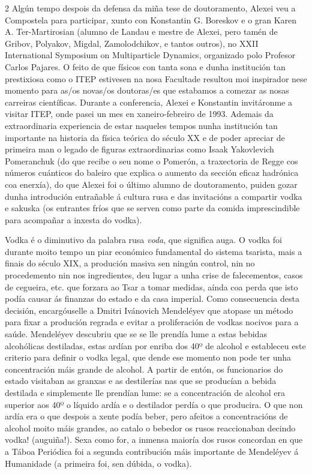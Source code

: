 \begin{multicols}{2}
Algún tempo despois da defensa da miña tese de doutoramento, Alexei veu a
Compostela para participar, xunto con Konstantin G. Boreskov e o gran Karen A.
Ter-Martirosian (alumno de Landau e mestre de Alexei, pero tamén de Gribov,
Polyakov, Migdal, Zamolodchikov, e tantos outros), no XXII International
Symposium on Multiparticle Dynamics, organizado polo Profesor Carlos Pajares. O
feito de que físicos con tanta sona e dunha institución tan prestixiosa como o
ITEP estivesen na nosa Facultade resultou moi inspirador nese momento para
as/os novas/os doutoras/es que estabamos a comezar as nosas carreiras
científicas. Durante a conferencia, Alexei e Konstantin invitáronme a visitar
ITEP, onde pasei un mes en xaneiro-febreiro de 1993. Ademais da extraordinaria
experiencia de estar naqueles tempos nunha institución tan importante na
historia da física teórica do século XX e de poder apreciar de primeira man o
legado de figuras extraordinarias como Isaak Yakovlevich Pomeranchuk (do que
recibe o seu nome o Pomerón, a traxectoria de Regge cos números cuánticos do
baleiro que explica o aumento da sección eficaz hadrónica coa enerxía), do que
Alexei foi o último alumno de doutoramento, puiden gozar dunha introdución
entrañable á cultura rusa e das invitacións a compartir vodka e sakuska (os
entrantes fríos que se serven como parte da comida imprescindible para
acompañar a inxesta do vodka).

Vodka é o diminutivo da palabra rusa \textit{voda}, que significa auga. O vodka
foi durante moito tempo un piar económico fundamental do sistema tsarista, mais
a finais do século XIX, a produción masiva sen ningún control, nin no
procedemento nin nos ingredientes, deu lugar a unha crise de falecementos,
casos de cegueira, etc. que forzara ao Tsar a tomar medidas, aínda coa perda
que isto podía causar ás finanzas do estado e da casa imperial. Como
consecuencia desta decisión, encargóuselle a Dmitri Ivánovich Mendeléyev que
atopase un método para fixar a produción regrada e evitar a proliferación de
vodkas nocivos para a saúde. Mendeléyev descubriu que se se lle prendía lume a
estas bebidas alcohólicas destiladas, estas ardían por enriba dos 40º de
alcohol e estableceu este criterio para definir o vodka legal, que dende ese
momento non pode ter unha concentración máis grande de alcohol. A partir de
entón, os funcionarios do estado visitaban as granxas e as destilerías nas que
se producían a bebida destilada e simplemente lle prendían lume: se a
concentración de alcohol era superior aos 40º o líquido ardía e o destilador
perdía o que producira. O que non ardía era o que despois a xente podía beber,
pero afeitos a concentracións de alcohol moito máis grandes, ao catalo o
bebedor os rusos reaccionaban decindo vodka! (auguiña!). Sexa como for, a
inmensa maioría dos rusos concordan en que a Táboa Periódica foi a segunda
contribución máis importante de Mendeléyev á Humanidade (a primeira foi, sen
dúbida, o vodka).


\end{multicols}
